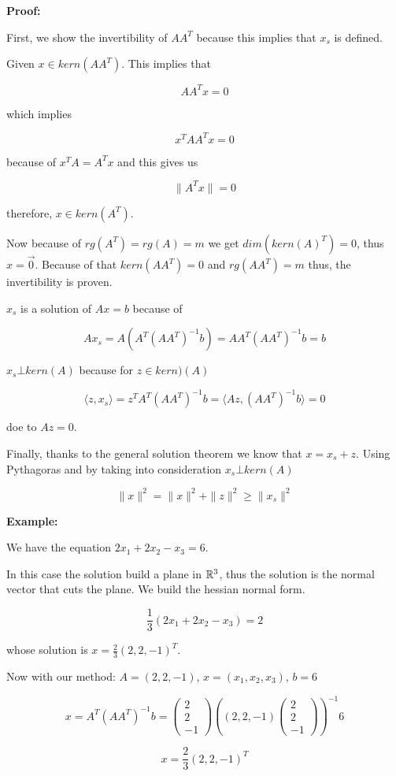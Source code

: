 \textbf{Proof:}

First, we show the invertibility of \(AA^T\) because this implies that \(x_s\) is defined.
\vspace{\baselineskip}

Given \(x \in kern(AA^T)\). This implies that 

\[
	AA^T x = 0	
\] 

which implies 

\[
	x^T AA^T x = 0
\] 

because of \(x^T A = A^T x\) and this gives us 

\[
	\|A^T x\| = 0
\] 

therefore, \(x \in kern(A^T)\).
\vspace{\baselineskip}

Now because of \(rg(A^T) = rg(A) = m\) we get \(dim(kern(A)^T) = 0\), thus \(x = \vec{0}\). 
Because of that \(kern(A A^T) = 0\) and \(rg(AA^T) = m\) thus, the invertibility is proven.
\vspace{\baselineskip}

\(x_s\) is a solution of \(Ax = b\) because of 

\[
	Ax_s = A(A^T {(A A^T)}^{-1} b) = AA^T {(A A^T)}^{-1} b = b
\]


\(x_s \bot kern(A)\) because for \(z \in kern)(A)\)

\[
	\langle z, x_s\rangle = z^T A^T {(A A^T)}^{-1} b = \langle Az, {(A A^T)}^{-1} b \rangle = 0
\]

doe to \(Az = 0\).
\vspace{\baselineskip}

Finally, thanks to the general solution theorem we know that \(x = x_s + z\). Using Pythagoras and by 
taking into consideration \(x_s \bot kern(A)\)

\[
	\| x\|^2 = \|x\|^2 + \|z\|^2 \ge \|x_s\|^2
\]


\textbf{Example:}
\vspace{\baselineskip}

We have the equation \(2x_1 + 2x_2 - x_3 = 6\).
\vspace{\baselineskip}

In this case the solution build a plane in \(\mathbb{R}^3\), thus the solution is the normal vector that 
cuts the plane. We build the hessian normal form.

\[
	\frac{1}{3} (2x_1 + 2x_2 - x_3) = 2
\]

whose solution is \(x = \frac{2}{3}(2, 2, -1)^T\).
\vspace{\baselineskip}

Now with our method: \(A = (2, 2, -1)\), \(x = (x_1, x_2, x_3)\), \(b = 6\)

\[
	x = A^T {(AA^T)}^{-1} b =
	\begin{pmatrix}
	2\\
	2\\
	-1
	\end{pmatrix}
	{\left(
		(2,2,-1)
	\begin{pmatrix}
	2\\
	2\\
	-1		
	\end{pmatrix}
	\right)}^{-1}
	6
\]

\[
	x = \frac{2}{3}(2, 2, -1)^T
\]

